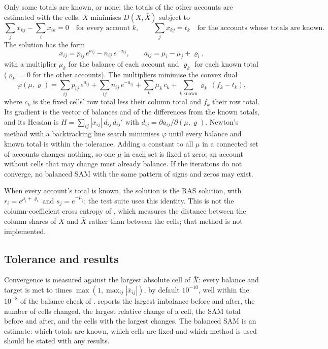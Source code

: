 Only some totals are known, or none: the totals of the other accounts are
estimated with the cells. $X$ minimises $D(X, \bar X)$ subject to
\begin{equation*}
\sum_j x_{kj} - \sum_i x_{ik} = 0 \quad \text{for every account } k,
\qquad
\sum_j x_{kj} = t_k \quad \text{for the accounts whose totals are known.}
\end{equation*}
The solution has the form
\begin{equation*}
x_{ij} = p_{ij}\,e^{a_{ij}} - n_{ij}\,e^{-a_{ij}}, \qquad a_{ij} = \mu_i - \mu_j + \varrho_i,
\end{equation*}
with a multiplier $\mu_k$ for the balance of each account and $\varrho_k$ for
each known total ($\varrho_k = 0$ for the other accounts). The multipliers
minimise the convex dual
\begin{equation*}
\varphi(\mu, \varrho) = \sum_{ij} p_{ij}\,e^{a_{ij}} + \sum_{ij} n_{ij}\,e^{-a_{ij}}
  + \sum_k \mu_k\,c_k + \sum_{k\ \text{known}} \varrho_k\,(f_k - t_k),
\end{equation*}
where $c_k$ is the fixed cells' row total less their column total and $f_k$
their row total. Its gradient is the vector of balances and of the
differences from the known totals, and its Hessian is
$H = \sum_{ij} |x_{ij}|\,d_{ij}\,d_{ij}'$ with $d_{ij} = \partial a_{ij} /
\partial(\mu, \varrho)$. Newton's method with a backtracking line search
minimises $\varphi$ until every balance and known total is within the
tolerance. Adding a constant to all $\mu$ in a connected set of accounts changes
nothing, so one $\mu$ in each set is fixed at zero; an account without cells
that may change must already balance. If the iterations do not converge, no
balanced SAM with the same pattern of signs and zeros may exist.

When every account's total is known, the solution is the RAS solution, with
$r_i = e^{\mu_i + \varrho_i}$ and $s_j = e^{-\mu_j}$; the test suite uses this
identity. This is not the column-coefficient cross entropy of
\citet{robinson2001}, which measures the distance between the column shares of
$X$ and $\bar X$ rather than between the cells; that method is not
implemented.

\subsection{Tolerance and results}

Convergence is measured against the largest absolute cell of $\bar X$: every
balance and target is met to  times $\max(1, \max_{ij}
|\bar x_{ij}|)$, by default $10^{-10}$, well within the $10^{-8}$ of the balance
check of .  reports the largest imbalance before
and after, the number of cells changed, the largest relative change of a cell,
the SAM total before and after, and the cells with the largest changes. The
balanced SAM is an estimate: which totals are known, which cells are fixed and
which method is used should be stated with any results.

